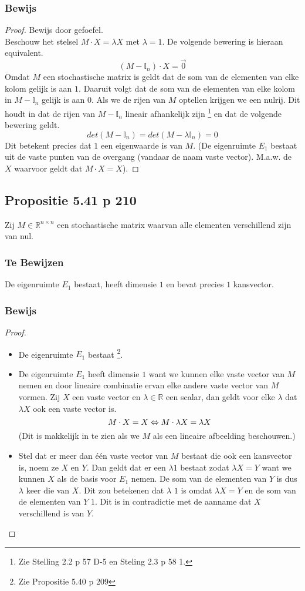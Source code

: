 \documentclass[lineaire_algebra_oplossingen.tex]{subfiles}
\begin{document}
\subsubsection*{Bewijs}
\begin{proof}
Bewijs door gefoefel.\\
Beschouw het stelsel $M\cdot X = \lambda X$ met $\lambda = 1$. De volgende bewering is hieraan equivalent.
\[
(M-\mathbb{I}_n)\cdot X = \vec{0}
\]
Omdat $M$ een stochastische matrix is geldt dat de som van de elementen van elke kolom gelijk is aan $1$. Daaruit volgt dat de som van de elementen van elke kolom in $M-\mathbb{I}_n$ gelijk is aan $0$. Als we de rijen van $M$ optellen krijgen we een nulrij. Dit houdt in dat de rijen van $M-\mathbb{I}_n$ lineair afhankelijk zijn \footnote{Zie Stelling 2.2 p 57 D-5 en Steling 2.3 p 58 1.} en dat de volgende bewering geldt.
\[
det(M - \mathbb{I}_n) = det(M - \lambda\mathbb{I}_n) = 0
\]
Dit betekent precies dat $1$ een eigenwaarde is van $M$.
(De eigenruimte $E_1$ bestaat uit de vaste punten van de overgang (vandaar de naam vaste vector). M.a.w. de $X$ waarvoor geldt dat $M\cdot X = X$).
\end{proof}


\subsection{Propositie 5.41 p 210}
Zij $M\in \mathbb{R}^{n\times n}$ een stochastische matrix waarvan alle elementen verschillend zijn van nul.
\subsubsection*{Te Bewijzen}
De eigenruimte $E_1$ bestaat, heeft dimensie $1$ en bevat precies $1$ kansvector.

\subsubsection*{Bewijs}
\begin{proof}
\begin{itemize}
\item De eigenruimte $E_1$ bestaat \footnote{Zie Propositie 5.40 p 209}. 
\item De eigenruimte $E_1$ heeft dimensie $1$ want we kunnen elke vaste vector van $M$ nemen en door lineaire combinatie ervan elke andere vaste vector van $M$ vormen. Zij $X$ een vaste vector en $\lambda \in \mathbb{R}$ een scalar, dan geldt voor elke $\lambda$ dat $\lambda X$ ook een vaste vector is.
\[
M\cdot X = X\\ \Leftrightarrow M\cdot \lambda X = \lambda X 
\]
(Dit is makkelijk in te zien als we $M$ als een lineaire afbeelding beschouwen.)
\item Stel dat er meer dan \'e\'en vaste vector van $M$ bestaat die ook een kansvector is, noem ze $X$ en $Y$.
Dan geldt dat er een $\lambda 1$ bestaat zodat $\lambda X = Y$ want we kunnen $X$ als de basis voor $E_1$ nemen. De som van de elementen van $Y$ is dus $\lambda$ keer die van $X$. Dit zou betekenen dat $\lambda$ $1$ is omdat $\lambda X = Y$ en de som van de elementen van $Y$ $1$. Dit is in contradictie met de aanname dat $X$ verschillend is van $Y$.
\end{itemize}
\end{proof}
\end{document}

